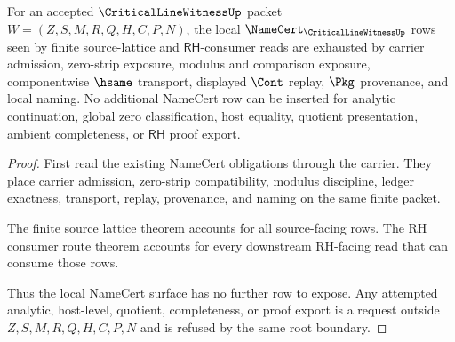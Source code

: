 \begin{theorem}
\label{thm:critical-line-witness-namecert-row-exhaustion}
For an accepted $\CriticalLineWitnessUp$ packet $W=(Z,S,M,R,Q,H,C,P,N)$, the local $\NameCert_{\CriticalLineWitnessUp}$ rows seen by finite source-lattice and $\mathsf{RH}$-consumer reads are exhausted by carrier admission, zero-strip exposure, modulus and comparison exposure, componentwise $\hsame$ transport, displayed $\Cont$ replay, $\Pkg$ provenance, and local naming. No additional NameCert row can be inserted for analytic continuation, global zero classification, host equality, quotient presentation, ambient completeness, or $\mathsf{RH}$ proof export.
\end{theorem}
\begin{proof}
First read the existing NameCert obligations through the carrier. They place carrier admission, zero-strip compatibility, modulus discipline, ledger exactness, transport, replay, provenance, and naming on the same finite packet.

The finite source lattice theorem accounts for all source-facing rows. The RH consumer route theorem accounts for every downstream RH-facing read that can consume those rows.

Thus the local NameCert surface has no further row to expose. Any attempted analytic, host-level, quotient, completeness, or proof export is a request outside $Z,S,M,R,Q,H,C,P,N$ and is refused by the same root boundary.
\end{proof}
